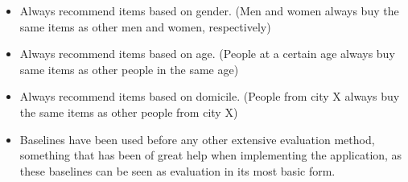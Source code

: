 \begin{itemize}
\item Always recommend items based on gender. (Men and women always buy the same items as other men and women, respectively)
\item Always recommend items based on age. (People at a certain age always buy same items as other people in the same age)
\item Always recommend items based on domicile. (People from city X always buy the same items as other people from city X)
\item Baselines have been used before any other extensive evaluation method, something that has been of great help when implementing the application, as these baselines can be seen as evaluation in its most basic form.

\end{itemize}

